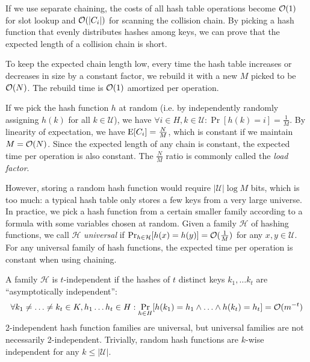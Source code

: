 If we use separate chaining, the costs of all hash table operations become
$\mathcal{O}(1)$ for slot lookup and $\mathcal{O}(|C_i|)$ for scanning the collision chain.
By picking a hash function that evenly distributes hashes among keys,
we can prove that the expected length of a collision chain is short.

To keep the expected chain length low, every time the hash table increases
or decreases in size by a constant factor, we rebuild it with a new $M$
picked to be $\mathcal{O}(N)$. The rebuild time is $\mathcal{O}(1)$ amortized per operation.

If we pick the hash function $h$ at random (i.e. by independently randomly
assigning $h(k)$ for all $k\in\mathcal{U}$), we have $\forall i\in H,
k\in\mathcal{U}: \Pr[h(k)=i]=\frac{1}{M}$.
By linearity of expectation, we have $\mathrm{E}[C_i]=\frac{N}{M}$, which is
constant if we maintain $M=\mathcal{O}(N)$. Since the expected length of any chain
is constant, the expected time per operation is also constant.
The $\frac{N}{M}$ ratio is commonly called the \emph{load factor}.

However, storing a random hash function would require $|\mathcal{U}|\log M$
bits, which is too much: a typical hash table only stores a few keys from a
very large universe.
In practice, we pick a hash function from a certain smaller family according to
a formula with some variables chosen at random.
Given a family $\mathcal{H}$ of hashing functions, we call $\mathcal{H}$
\emph{universal} if $\Pr_{h\in \mathcal{H}}[h(x)=h(y)]=\mathcal{O}(\frac{1}{M})$ for any
$x, y\in\mathcal{U}$.
For any universal family of hash functions, the expected time per operation
is constant when using chaining.

A family $\mathcal{H}$ is $t$-independent if the hashes of $t$ distinct keys
$k_1,\ldots k_t$ are ``asymptotically independent'':
$$\forall k_1\neq\ldots \neq k_t\in K,
	h_1\ldots h_t\in H: \Pr_{h\in H}[h(k_1)=h_1\wedge \ldots \wedge
	h(k_t)=h_t]=\mathcal{O}(m^{-t})$$
2-independent hash function families are universal, but universal families
are not necessarily 2-independent.
Trivially, random hash functions are $k$-wise independent for any
$k\leq|\mathcal{U}|$.


